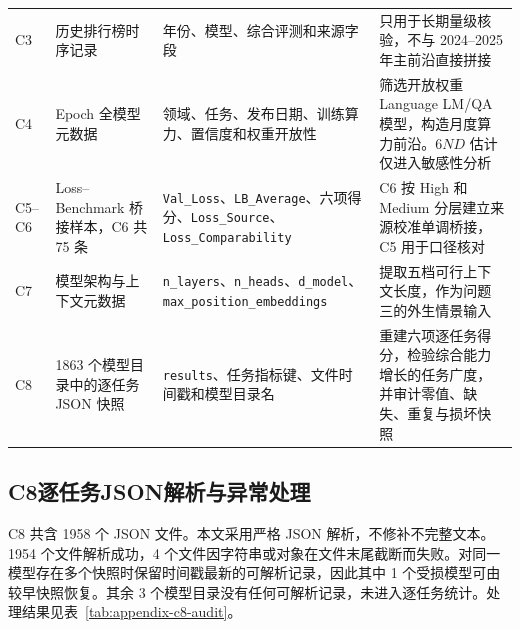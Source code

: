 \documentclass[bwprint]{gmcmthesis}
\begin{document}
\begin{appendices}
\begin{longtable}{P{1.15cm} C{3.65cm} C{4.25cm} C{5.55cm}}
        C3       & 历史排行榜时序记录                                     & 年份、模型、综合评测和来源字段                                                                                          & 只用于长期量级核验，不与 2024--2025 年主前沿直接拼接                                \\
        C4       & Epoch 全模型元数据                                  & 领域、任务、发布日期、训练算力、置信度和权重开放性                                                                                & 筛选开放权重 Language LM/QA 模型，构造月度算力前沿。$6ND$ 估计仅进入敏感性分析              \\
        C5--C6   & Loss--Benchmark 桥接样本，C6 共 75 条                & \texttt{Val\_Loss}、\texttt{LB\_Average}、六项得分、\texttt{Loss\_Source}、\texttt{Loss\_Comparability}          & C6 按 High 和 Medium 分层建立来源校准单调桥接，C5 用于口径核对                       \\
        C7       & 模型架构与上下文元数据                                   & \texttt{n\_layers}、\texttt{n\_heads}、\texttt{d\_model}、\texttt{max\_position\_embeddings}                & 提取五档可行上下文长度，作为问题三的外生情景输入                                        \\
        C8       & 1863 个模型目录中的逐任务 JSON 快照                       & \texttt{results}、任务指标键、文件时间戳和模型目录名                                                                       & 重建六项逐任务得分，检验综合能力增长的任务广度，并审计零值、缺失、重复与损坏快照                        \\
    \end{longtable}
    \endgroup

    \subsection{C8逐任务JSON解析与异常处理}

    C8 共含 1958 个 JSON 文件。本文采用严格 JSON 解析，不修补不完整文本。1954 个文件解析成功，4 个文件因字符串或对象在文件末尾截断而失败。对同一模型存在多个快照时保留时间戳最新的可解析记录，因此其中 1 个受损模型可由较早快照恢复。其余 3 个模型目录没有任何可解析记录，未进入逐任务统计。处理结果见表~\ref{tab:appendix-c8-audit}。


\end{appendices}
\end{document}
